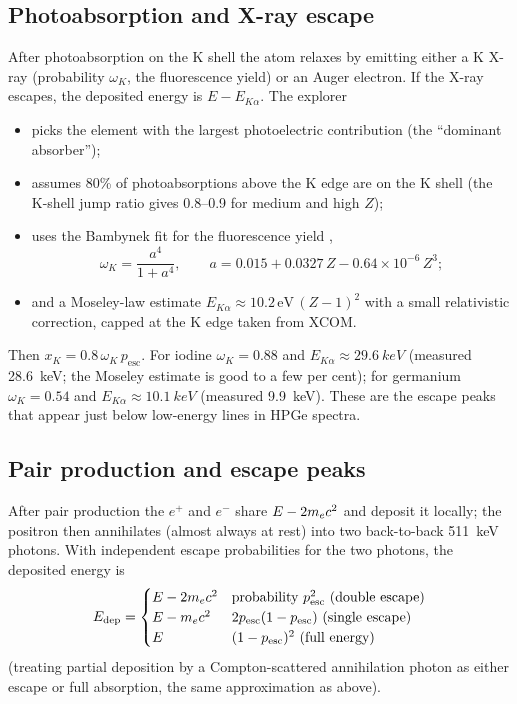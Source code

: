 \subsection{Photoabsorption and X-ray escape}
After photoabsorption on the K shell the atom relaxes by emitting either a K X-ray (probability $\omega_K$, the fluorescence yield) or an Auger electron. If the X-ray escapes, the deposited energy is $E - E_{K\alpha}$. The explorer
\begin{itemize}
\item picks the element with the largest photoelectric contribution (the ``dominant absorber'');
\item assumes 80\% of photoabsorptions above the K edge are on the K shell (the K-shell jump ratio gives 0.8--0.9 for medium and high $Z$);
\item uses the Bambynek fit for the fluorescence yield \cite{bambynek},
\begin{equation}
\omega_K = \frac{a^4}{1+a^4}, \qquad a = 0.015 + 0.0327\,Z - 0.64\times10^{-6}\,Z^3;
\end{equation}
\item and a Moseley-law estimate $E_{K\alpha} \approx 10.2\,\mathrm{eV}\,(Z-1)^2$ with a small relativistic correction, capped at the K edge taken from XCOM.
\end{itemize}
Then $x_K = 0.8\,\omega_K\,p_\text{esc}$. For iodine $\omega_K = 0.88$ and $E_{K\alpha} \approx \SI{29.6}{keV}$ (measured \SI{28.6}{keV}; the Moseley estimate is good to a few per cent); for germanium $\omega_K = 0.54$ and $E_{K\alpha} \approx \SI{10.1}{keV}$ (measured \SI{9.9}{keV}). These are the escape peaks that appear just below low-energy lines in HPGe spectra.

\subsection{Pair production and escape peaks}
After pair production the $e^+$ and $e^-$ share $E - 2m_e c^2$ and deposit it locally; the positron then annihilates (almost always at rest) into two back-to-back \SI{511}{keV} photons. With independent escape probabilities for the two photons, the deposited energy is
\begin{equation}
E_\text{dep} = \begin{cases} E - 2m_e c^2 & \text{probability } p_\text{esc}^2 \text{ (double escape)}\\
E - m_e c^2 & 2p_\text{esc}(1-p_\text{esc}) \text{ (single escape)}\\
E & (1-p_\text{esc})^2 \text{ (full energy)}\end{cases}
\end{equation}
(treating partial deposition by a Compton-scattered annihilation photon as either escape or full absorption, the same approximation as above).

